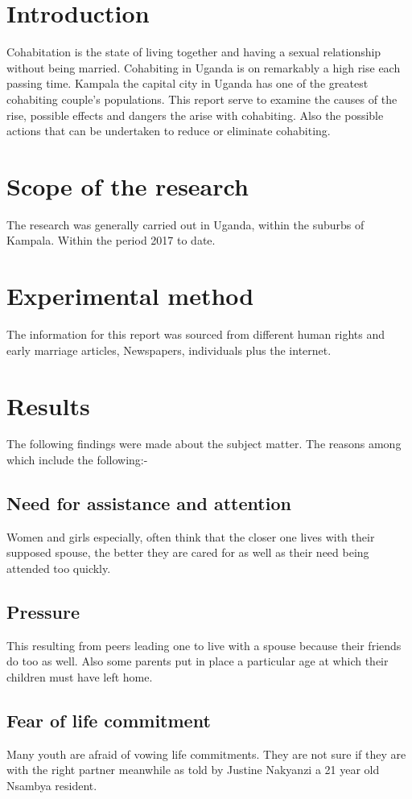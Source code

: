 \documentclass[12pt]{article}
\begin{document}
\section{Introduction} 
Cohabitation is the state of living together and having a sexual relationship without being married.
Cohabiting in Uganda is on remarkably a high rise each passing time. Kampala the capital city in Uganda has one of the greatest cohabiting couple's populations.
This report serve to examine the causes of the rise, possible effects and dangers the arise with cohabiting. Also the possible actions that can be undertaken to reduce or eliminate cohabiting.

\section{Scope of the research}
The research was generally carried out in Uganda, within the suburbs of Kampala. Within the period 2017 to date.
\section{Experimental method}
The information for this report was sourced from different human rights and early marriage articles, Newspapers, individuals plus the internet.
\section{Results}
The following findings were made about the subject matter. The reasons among which include the following:-

\subsection{Need for assistance and attention}
Women and girls especially, often think that the closer one lives with their supposed spouse, the better they are cared for as well as their need being attended too quickly.
\subsection{Pressure}
This resulting from peers leading one to live with a spouse because their friends do too as well. Also some parents put in place a particular age at which their children must have left home.
\subsection{Fear of life commitment}
Many youth are afraid of vowing life commitments. They are not sure if they are with the right partner meanwhile as told by Justine Nakyanzi a 21 year old Nsambya resident.
\end{document}

